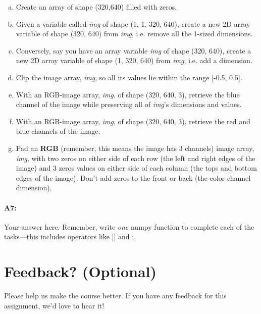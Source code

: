 \begin{enumerate}[a.]
    \item Create an array of shape (320,640) filled with zeros.
    \item Given a variable called \emph{img} of shape (1, 1, 320, 640), create a new 2D array variable of shape (320, 640) from \emph{img}, i.e. remove all the 1-sized dimensions.
    \item Conversely, say you have an array variable \emph{img} of shape (320, 640), create a new 2D array variable of shape (1, 320, 640) from \emph{img}, i.e. add a dimension.
    \item Clip the image array, \emph{img}, so all its values lie within the range [-0.5, 0.5].
    \item With an RGB-image array, \emph{img}, of shape (320, 640, 3), retrieve the blue channel of the image while preserving all of \emph{img}'s dimensions and values.
    \item With an RGB-image array, \emph{img}, of shape (320, 640, 3), retrieve the red and blue channels of the image.
    \item Pad an \textbf{RGB} (remember, this means the image has 3 channels) image array, \emph{img}, with two zeros on either side of each row (the left and right edges of the image) and 3 zeros values on either side of each column (the tops and bottom edges of the image). Don't add zeros to the front or back (the color channel dimension).
\end{enumerate}


\pagebreak
\paragraph{A7:} Your answer here. Remember, write \emph{one} numpy function to complete each of the tasks---this includes operators like [] and :.



\pagebreak
\section*{Feedback? (Optional)}
Please help us make the course better. If you have any feedback for this assignment, we'd love to hear it!


